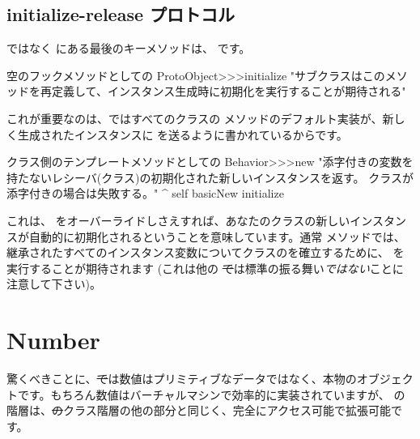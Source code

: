 \documentclass[a4paper,10pt,twoside]{book}
\begin{document}
\subsection{initialize-release プロトコル}%

 ではなく  にある最後のキーメソッドは、 です。

\begin{method}{空のフックメソッドとしての }
ProtoObject>>>initialize
   "サブクラスはこのメソッドを再定義して、インスタンス生成時に初期化を実行することが期待される"
\end{method} %

これが重要なのは、\pharo ではすべてのクラスの  メソッドのデフォルト実装が、新しく生成されたインスタンスに  を送るように書かれているからです。

\begin{method}{クラス側のテンプレートメソッドとしての } %
Behavior>>>new
    "添字付きの変数を持たないレシーバ(クラス)の初期化された新しいインスタンスを返す。
    クラスが添字付きの場合は失敗する。"
    ^ self basicNew initialize
\end{method}

これは、 をオーバーライドしさえすれば、あなたのクラスの新しいインスタンスが自動的に初期化されるということを意味しています。通常  メソッドでは、継承されたすべてのインスタンス変数についてクラスのを確立するために、 を実行することが期待されます%
(これは他の \st では標準の振る舞い\emph{ではない}ことに注意して下さい)。%

\section{Number}
驚くべきことに、\st では数値はプリミティブなデータではなく、本物のオブジェクトです。もちろん数値はバーチャルマシンで効率的に実装されていますが、 の階層は、\st のクラス階層の他の部分と同じく、完全にアクセス可能で拡張可能です。
\end{document}
